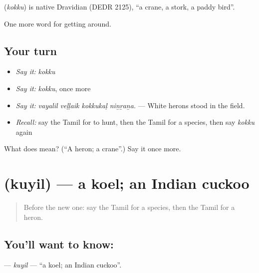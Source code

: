 \begin{cousinweb}
\textbf{} (\emph{kokku}) is native Dravidian (DEDR 2125), \textquotedblleft{}a crane, a stork, a paddy bird\textquotedblright{}.
\end{cousinweb}

\begin{grammarlens}[title={What you've built}]
One more word for getting around.
\end{grammarlens}

\subsection*{Your turn}
\begin{itemize}
\raggedright
  \item \emph{Say it:} \emph{kokku}
  \item \emph{Say it:} \emph{kokku}, once more
  \item \emph{Say it:} \emph{vayalil veḷḷaik kokkukaḷ niṉṟaṉa.} — White herons stood in the field.
  \item \emph{Recall:} say the Tamil for to hunt, then the Tamil for a species, then say \emph{kokku} again
\end{itemize}

\begin{tcolorbox}[breakable,colback=teal!4,colframe=teal!35!black,title={Before you move on}]
What does  mean? (\textquotedblleft{}A heron; a crane\textquotedblright{}.) Say it once more.
\end{tcolorbox}
\section[\texorpdfstring{\ta{குயில்} (kuyil)}{குயில் (kuyil)}]{ (kuyil) — a koel; an Indian cuckoo}

\label{lesson:TA-C438-kuyil}



\begin{quote}
Before the new one: say the Tamil for a species, then the Tamil for a heron.
\end{quote}

\subsection*{You'll want to know: }
\textbf{} — \emph{kuyil} — \textquotedblleft{}a koel; an Indian cuckoo\textquotedblright{}.

